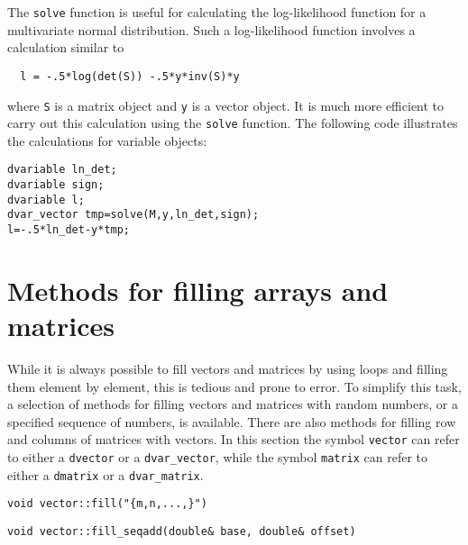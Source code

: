 \documentclass{admbmanual}
\begin{document}
The \texttt{solve} function is useful for calculating the log-likelihood
function for a multivariate normal distribution.
Such a log-likelihood function involves a calculation similar to
\begin{lstlisting}
  l = -.5*log(det(S)) -.5*y*inv(S)*y
\end{lstlisting}
where \texttt{S} is a matrix object and \texttt{y} is a vector object.
It is much more efficient to carry out this calculation using
the \texttt{solve} function. The following code illustrates the
calculations for variable objects: 
\begin{lstlisting}
dvariable ln_det;
dvariable sign;
dvariable l;
dvar_vector tmp=solve(M,y,ln_det,sign);
l=-.5*ln_det-y*tmp;
\end{lstlisting}


\section{Methods for filling arrays and matrices}

While it is always possible to fill vectors and matrices by
using loops and filling them element by element, this is tedious
and prone to error. To simplify this task, a selection 
of methods for filling vectors and
matrices with random numbers, or a specified sequence of numbers, is available.
There are also methods for filling row and columns of matrices with
vectors. In this section the symbol \texttt{vector} can refer to either
a \texttt{dvector} or a \texttt{dvar\_vector},
while the symbol \texttt{matrix} can refer to either
a \texttt{dmatrix} or a \texttt{dvar\_matrix}.


\begin{lstlisting}
void vector::fill("{m,n,...,}")
\end{lstlisting}

\begin{lstlisting}
void vector::fill_seqadd(double& base, double& offset)
\end{lstlisting}
\end{document}
